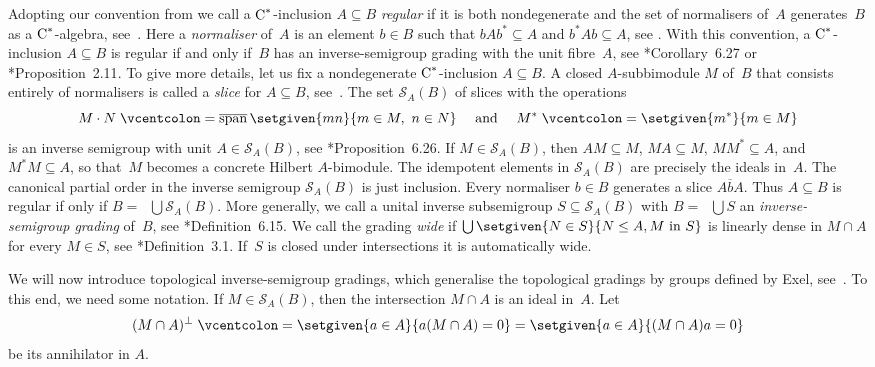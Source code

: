 \documentclass[a4paper]{amsart}
\theoremstyle{plain}
\theoremstyle{definition}
\theoremstyle{remark}
\numberwithin{theorem}{section}
\numberwithin{equation}{section}
\DeclareMathOperator*{\clsp}{\overline{span}} %
\newcommand*{\nb}{\nobreakdash}
\newcommand*{\Cst}{\textup C^*}%
\newcommand*{\Slice}{\mathcal S}%
\newcommand*{\defeq}{\mathrel{\vcentcolon=}}%
\begin{document}
Adopting our convention from \cites{Kwasniewski-Meyer:Stone_duality,
  Kwasniewski-Meyer:Pure_infiniteness, Kwasniewski-Meyer:Cartan} we
call a \(\Cst\)\nb-inclusion \(A\subseteq B\) \emph{regular} if it is
both nondegenerate and the set of normalisers of~\(A\) generates~\(B\)
as a \(\Cst\)\nb-algebra, see~\cite{Renault:Cartan.Subalgebras}.
Here a \emph{normaliser} of~\(A\) is an element \(b\in B\) such that
\(b A b^*\subseteq A\) and \(b^* A b\subseteq A\), see
\cite{Kumjian:Diagonals}.
With this convention, a \(\Cst\)\nb-inclusion \(A\subseteq B\) is
regular if and only if~\(B\)  has an inverse-semigroup grading with
the unit fibre~\(A\), see
\cite{Kwasniewski-Meyer:Stone_duality}*{Corollary~6.27} or
\cite{Kwasniewski-Meyer:Pure_infiniteness}*{Proposition~2.11}.
To give more details,
let us fix a  nondegenerate \(\Cst\)\nb-inclusion \(A\subseteq B\).
A closed \(A\)\nb-subbimodule $M$ of~\(B\) that consists entirely
of normalisers is called a \emph{slice} for \(A\subseteq B\), see~\cite{Exel:noncomm.cartan}.
The set \(\Slice_A(B)\) of slices with the operations
\[
  M\cdot N\defeq \clsp {}\setgiven{m n}{m \in
   M,\ n\in N}\quad\text{  and } \quad M^*\defeq \setgiven{m^*}{m \in M}
\]
is an inverse semigroup with unit \(A \in \Slice_A(B)\), see \cite{Kwasniewski-Meyer:Stone_duality}*{Proposition~6.26}.
If \(M\in \Slice_A(B)\), then \(A M \subseteq M\), \(M A \subseteq
M\), \(MM^*\subseteq A\), and \(M^*M \subseteq A\), so
that~\(M\) becomes a concrete Hilbert \(A\)\nb-bimodule.
The idempotent elements in \(\Slice_A(B)\) are precisely the ideals
in~\(A\).
The canonical partial order in the inverse semigroup \(\Slice_A(B)\)
is just inclusion.
Every normaliser \(b\in B\) generates a  slice \(\overline{AbA}\).
Thus  \(A\subseteq B\) is regular if only if \(B=\clsp\bigcup\Slice_A(B)\).
More generally, we call a unital inverse subsemigroup \(S\subseteq
\Slice_A(B)\) with \(B=\clsp\bigcup S\) an \emph{inverse-semigroup
  grading} of~\(B\), see
\cite{Kwasniewski-Meyer:Stone_duality}*{Definition~6.15}.
We call the grading \emph{wide} if \(\bigcup\setgiven{N\in S}{N\le A,
  M \text{ in }S}\) is linearly dense in \(M\cap A\) for every \(M\in
S\), see \cite{Kwasniewski-Meyer:Cartan}*{Definition~3.1}.
If~\(S\) is closed under intersections it is automatically wide.

We will now introduce topological inverse-semigroup gradings, which
generalise the topological gradings by groups defined by Exel,
see~\cite{Exel:Partial_dynamical}.
To this end, we need some notation.
If \(M\in \Slice_A(B)\), then the intersection \(M\cap A\) is an ideal
in~\(A\).
Let
\[
  (M\cap A)^\bot
  \defeq \setgiven{a\in A}{a (M\cap A)=0}
  = \setgiven{a\in A}{ (M\cap A)a=0}
\]
be its annihilator in \(A\).
\end{document}
